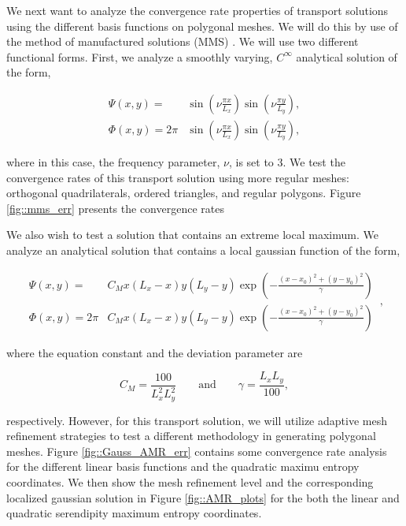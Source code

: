\documentclass[11pt]{article}
\begin{document}
We next want to analyze the convergence rate properties of transport solutions using the different basis functions on polygonal meshes. We will do this by use of the method of manufactured solutions (MMS) \cite{salari2000code}. We will use two different functional forms. First, we analyze a smoothly varying, $C^{\infty}$ analytical solution of the form,

\begin{equation}
\label{eq::sin_eq}
\begin{aligned}
	\Psi(x,y) = &\sin (\nu \frac{\pi x}{L_x}) \sin (\nu \frac{\pi y}{L_y}), \\
	\Phi(x,y) = 2 \pi &\sin (\nu \frac{\pi x}{L_x}) \sin (\nu \frac{\pi y}{L_y}),
\end{aligned}
\end{equation}

\noindent where in this case, the frequency parameter, $\nu$, is set to 3. We test the convergence rates of this transport solution using more regular meshes: orthogonal quadrilaterals, ordered triangles, and regular polygons. Figure \ref{fig::mms_err} presents the convergence rates 

We also wish to test a solution that contains an extreme local maximum. We analyze an analytical solution that contains a local gaussian function of the form,

\begin{equation}
\label{eq::gauss_eq}
\begin{aligned}
	\Psi (x,y) = & C_M x (L_x - x) y (L_y - y) \exp(-\frac{(x-x_0)^2 + (y-y_0)^2}{\gamma}) \\ 
	\Phi (x,y) = 2 \pi & C_M x (L_x - x) y (L_y - y) \exp(-\frac{(x-x_0)^2 + (y-y_0)^2}{\gamma})
\end{aligned} \, ,
\end{equation}

\noindent where the equation constant and the deviation parameter are

\begin{equation}
\label{eq::gaussconsts}
C_M = \frac{100}{L_x^2 L_y^2} \qquad \text{and} \qquad \gamma = \frac{L_x L_y}{100} ,
\end{equation}

\noindent respectively. However, for this transport solution, we will utilize adaptive mesh refinement strategies to test a different methodology in generating polygonal meshes. Figure \ref{fig::Gauss_AMR_err} contains some convergence rate analysis for the different linear basis functions and the quadratic maximu entropy coordinates. We then show the mesh refinement level and the corresponding localized gaussian solution in Figure \ref{fig::AMR_plots} for the both the linear and quadratic serendipity maximum entropy coordinates.
\end{document}
